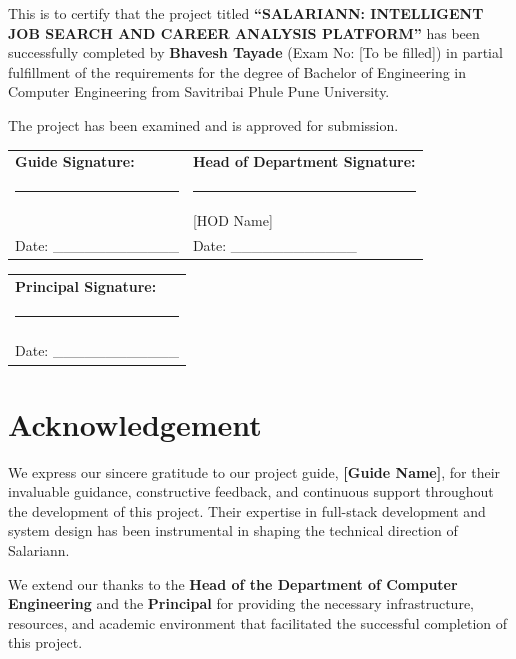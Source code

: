 \documentclass[12pt,a4paper,oneside]{report}
\begin{document}
\vspace{1.5cm}

This is to certify that the project titled \textbf{``SALARIANN: INTELLIGENT JOB SEARCH AND CAREER ANALYSIS PLATFORM''} has been successfully completed by \textbf{Bhavesh Tayade} (Exam No: [To be filled]) in partial fulfillment of the requirements for the degree of Bachelor of Engineering in Computer Engineering from Savitribai Phule Pune University.

The project has been examined and is approved for submission.

\vspace{2cm}

\begin{tabular}{p{4cm}p{4cm}}
    \textbf{Guide Signature:} & \textbf{Head of Department Signature:}\\
    \hrule & \hrule \\
    [Guide Name] & [HOD Name]\\
    Date: \_\_\_\_\_\_\_\_\_\_\_\_ & Date: \_\_\_\_\_\_\_\_\_\_\_\_
\end{tabular}

\vspace{2cm}

\begin{tabular}{p{8cm}}
    \textbf{Principal Signature:}\\
    \hrule \\
    [Principal Name]\\
    Date: \_\_\_\_\_\_\_\_\_\_\_\_
\end{tabular}

\newpage
\thispagestyle{frontmatter}
\chapter*{Acknowledgement}

We express our sincere gratitude to our project guide, \textbf{[Guide Name]}, for their invaluable guidance, constructive feedback, and continuous support throughout the development of this project. Their expertise in full-stack development and system design has been instrumental in shaping the technical direction of Salariann.

We extend our thanks to the \textbf{Head of the Department of Computer Engineering} and the \textbf{Principal} for providing the necessary infrastructure, resources, and academic environment that facilitated the successful completion of this project.
\end{document}
